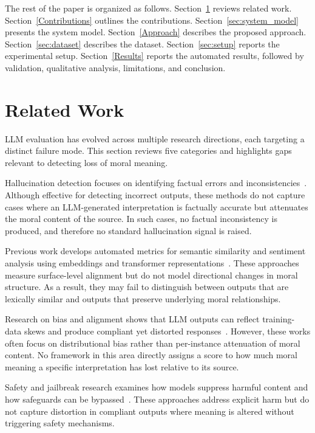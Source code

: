 \documentclass[10pt, conference]{IEEEtran}
\begin{document}
The rest of the paper is organized as follows. Section~\ref{related} reviews related work. Section~\ref{Contributions} outlines the contributions. Section~\ref{sec:system_model} presents the system model. Section~\ref{Approach} describes the proposed approach. Section~\ref{sec:dataset} describes the dataset. Section~\ref{sec:setup} reports the experimental setup. Section~\ref{Results} reports the automated results, followed by validation, qualitative analysis, limitations, and conclusion.

\section{Related Work} \label{related}

LLM evaluation has evolved across multiple research directions, each targeting a distinct failure mode. This section reviews five categories and highlights gaps relevant to detecting loss of moral meaning.

Hallucination detection focuses on identifying factual errors and inconsistencies~\cite{williamson2024deception, malin2025faithfulness, singh2025transformer}. Although effective for detecting incorrect outputs, these methods do not capture cases where an LLM-generated interpretation is factually accurate but attenuates the moral content of the source. In such cases, no factual inconsistency is produced, and therefore no standard hallucination signal is raised.

Previous work develops automated metrics for semantic similarity and sentiment analysis using embeddings and transformer representations~\cite{rao2025semantic, shang2025summarization, feng2024clinical, hany2023relatedness, horvat2024sentiment, cheng2024twitter}. These approaches measure surface-level alignment but do not model directional changes in moral structure. As a result, they may fail to distinguish between outputs that are lexically similar and outputs that preserve underlying moral relationships.

Research on bias and alignment shows that LLM outputs can reflect training-data skews and produce compliant yet distorted responses~\cite{dhingra2025bias, barnhart2025alignment, kay2024epistemic, kashiramka2024ai}. However, these works often focus on distributional bias rather than per-instance attenuation of moral content. No framework in this area directly assigns a score to how much moral meaning a specific interpretation has lost relative to its source.

Safety and jailbreak research examines how models suppress harmful content and how safeguards can be bypassed~\cite{nguyen2025guardrails, knowlton2026jailbreak, sornette2026alignment}. These approaches address explicit harm but do not capture distortion in compliant outputs where meaning is altered without triggering safety mechanisms.
\end{document}
